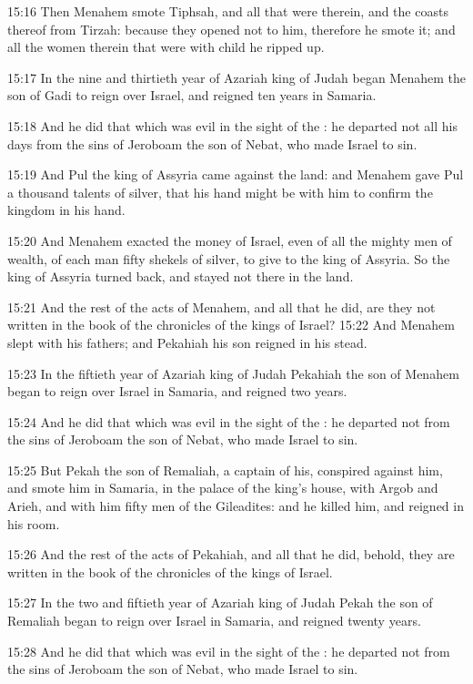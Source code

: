 15:16 Then Menahem smote Tiphsah, and all that were therein, and the coasts thereof from Tirzah: because they opened not to him, therefore he smote it; and all the women therein that were with child he ripped up.

15:17 In the nine and thirtieth year of Azariah king of Judah began Menahem the son of Gadi to reign over Israel, and reigned ten years in Samaria.

15:18 And he did that which was evil in the sight of the \LORD: he departed not all his days from the sins of Jeroboam the son of Nebat, who made Israel to sin.

15:19 And Pul the king of Assyria came against the land: and Menahem gave Pul a thousand talents of silver, that his hand might be with him to confirm the kingdom in his hand.

15:20 And Menahem exacted the money of Israel, even of all the mighty men of wealth, of each man fifty shekels of silver, to give to the king of Assyria. So the king of Assyria turned back, and stayed not there in the land.

15:21 And the rest of the acts of Menahem, and all that he did, are they not written in the book of the chronicles of the kings of Israel?  15:22 And Menahem slept with his fathers; and Pekahiah his son reigned in his stead.

15:23 In the fiftieth year of Azariah king of Judah Pekahiah the son of Menahem began to reign over Israel in Samaria, and reigned two years.

15:24 And he did that which was evil in the sight of the \LORD: he departed not from the sins of Jeroboam the son of Nebat, who made Israel to sin.

15:25 But Pekah the son of Remaliah, a captain of his, conspired against him, and smote him in Samaria, in the palace of the king's house, with Argob and Arieh, and with him fifty men of the Gileadites: and he killed him, and reigned in his room.

15:26 And the rest of the acts of Pekahiah, and all that he did, behold, they are written in the book of the chronicles of the kings of Israel.

15:27 In the two and fiftieth year of Azariah king of Judah Pekah the son of Remaliah began to reign over Israel in Samaria, and reigned twenty years.

15:28 And he did that which was evil in the sight of the \LORD: he departed not from the sins of Jeroboam the son of Nebat, who made Israel to sin.

